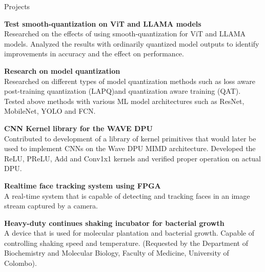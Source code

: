\documentclass[
	11pt, %
]{./../assets/resume} %
\begin{document}
\begin{rSection}{Projects}

	\textbf{Test smooth-quantization on ViT and LLAMA models} \\
	Researched on the effects of using smooth-quantization for ViT and LLAMA models. Analyzed the results with ordinarily quantized model outputs to identify improvements in accuracy and the effect on performance.

	\textbf{Research on model quantization} \\
	Researched on different types of model quantization methods such as loss aware post-training quantization (LAPQ)and quantization aware training (QAT). Tested above methods with various ML model architectures such as ResNet, MobileNet, YOLO and FCN.

	\textbf{CNN Kernel library for the WAVE DPU} \\
	Contributed to development of a library of kernel primitives that would later be used to implement CNNs on the Wave DPU MIMD architecture. Developed the ReLU, PReLU, Add and Conv1x1 kernels and verified proper operation on actual DPU.

	\textbf{Realtime face tracking system using FPGA} \\
	A real-time system that is capable of detecting and tracking faces in an image stream captured by a camera.

	\textbf{Heavy-duty continues shaking incubator for bacterial growth} \\
	A device that is used for molecular plantation and bacterial growth. Capable of controlling shaking speed and temperature. (Requested by the Department of Biochemistry and Molecular Biology, Faculty of Medicine, University of Colombo).

\end{rSection}





\end{document}
